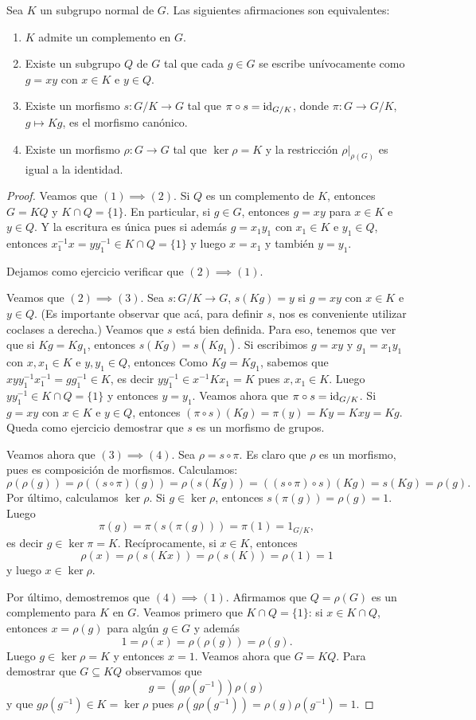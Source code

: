 \begin{proposition}
Sea $K$ un subgrupo normal de $G$. Las siguientes afirmaciones son equivalentes:
\begin{enumerate}
\item $K$ admite un complemento en $G$.
\item Existe 	un subgrupo $Q$ de $G$ tal que cada $g\in G$ se escribe unívocamente como $g=xy$ con $x\in K$ e $y\in Q$.
\item Existe un morfismo $s\colon G/K\to G$ tal que $\pi\circ s=\operatorname{id}_{G/K}$, donde $\pi\colon G\to G/K$, $g\mapsto Kg$, es el morfismo canónico.
\item Existe un morfismo $\rho\colon G\to G$ tal que $\ker\rho=K$ y la restricción $\rho|_{\rho(G)}$ es igual a la identidad.  
\end{enumerate}
\end{proposition}

\begin{proof}
Veamos que $(1)\implies(2)$. Si $Q$ es un complemento de $K$, entonces $G=KQ$ y $K\cap Q=\{1\}$. En particular, si $g\in G$, entonces $g=xy$ para $x\in K$ e $y\in Q$. Y la escritura es única pues si además $g=x_1y_1$ con $x_1\in K$ e $y_1\in Q$, entonces $x_1^{-1}x=yy_1^{-1}\in K\cap Q=\{1\}$ y luego $x=x_1$ y también $y=y_1$. 

Dejamos como ejercicio verificar que $(2)\implies(1)$.

Veamos que $(2)\implies(3)$. Sea $s\colon G/K\to G$, $s(Kg)=y$ si $g=xy$ con $x\in K$ e $y\in Q$. (Es importante observar que 
acá, para definir $s$, nos es conveniente utilizar coclases a derecha.) Veamos que $s$ está bien definida. Para eso, tenemos que ver que si $Kg=Kg_1$, entonces $s(Kg)=s(Kg_1)$. Si escribimos $g=xy$ y $g_1=x_1y_1$ con $x,x_1\in K$ e $y,y_1\in Q$, entonces
Como $Kg=Kg_1$, sabemos que $xyy_1^{-1}x_1^{-1}=gg_1^{-1}\in K$, es decir $yy_1^{-1}\in x^{-1}Kx_1=K$ pues $x,x_1\in K$. Luego $yy_1^{-1}\in K\cap Q=\{1\}$ y entonces $y=y_1$. Veamos ahora que $\pi\circ s=\operatorname{id}_{G/K}$. Si $g=xy$ con $x\in K$ e $y\in Q$, entonces  
$(\pi\circ s)(Kg)=\pi(y)=Ky=Kxy=Kg$. Queda como ejercicio demostrar que $s$ es un morfismo de grupos. 

Veamos ahora que $(3)\implies(4)$. Sea $\rho=s\circ\pi$. Es claro que $\rho$ es un morfismo, pues es composición de morfismos. Calculamos:
\[
\rho(\rho(g))=\rho( (s\circ\pi)(g))=\rho(s(Kg))=((s\circ\pi)\circ s)(Kg)=s(Kg)=\rho(g).
\]
Por último, calculamos $\ker\rho$. Si $g\in\ker\rho$, entonces $s(\pi(g))=\rho(g)=1$. Luego
\[
\pi(g)=\pi(s(\pi(g)))=\pi(1)=1_{G/K},
\]  
es decir $g\in\ker\pi=K$. Recíprocamente, si $x\in K$, entonces
\[
\rho(x)=\rho(s(Kx))=\rho(s(K))=\rho(1)=1
\]
y luego $x\in\ker\rho$. 

Por último, demostremos que $(4)\implies(1)$. Afirmamos que $Q=\rho(G)$ es un complemento para $K$ en $G$. Veamos primero que $K\cap Q=\{1\}$: si $x\in K\cap Q$, entonces $x=\rho(g)$ para algún $g\in G$ y además 
\[
1=\rho(x)=\rho(\rho(g))=\rho(g).
\]
Luego $g\in\ker\rho=K$ y entonces $x=1$. Veamos ahora que $G=KQ$. Para demostrar que $G\subseteq KQ$ observamos que
\[
g=(g\rho(g^{-1}))\rho(g)
\]
y que $g\rho(g^{-1})\in K=\ker\rho$ pues $\rho(g\rho(g^{-1}))=	\rho(g)\rho(g^{-1})=1$.  
\end{proof}

